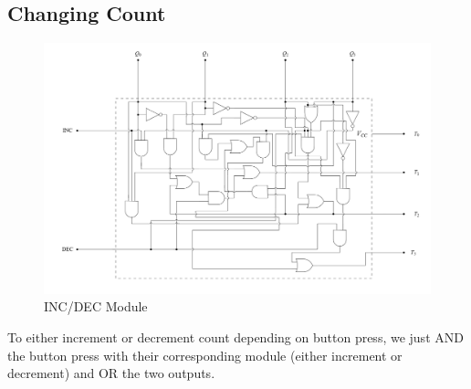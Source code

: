 \documentclass{article}
\begin{document}
\subsection{Changing Count}
\begin{figure}[h!]
    \includegraphics[width=1\linewidth]{figs/incdec.png}
    \caption{INC/DEC Module}
    \label{fig:enter-label}
\end{figure}
To either increment or decrement count depending on button press, we just AND the button press with their corresponding module (either increment or decrement) and OR the two outputs.
\end{document}
